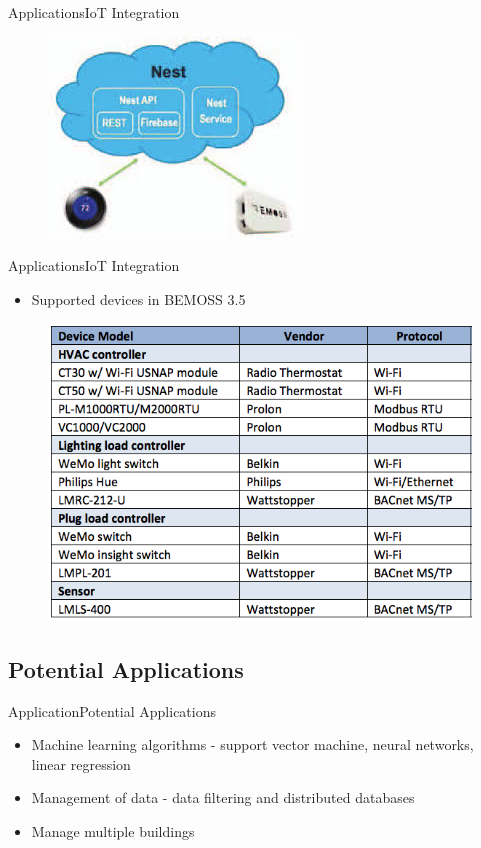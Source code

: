 \documentclass{beamer}
\begin{document}
\begin{frame}{Applications}{IoT Integration}
	\begin{figure}
		\includegraphics[scale=0.7]{figs/nestAndBEMOSS.jpg}
	\end{figure}

\end{frame}

\begin{frame}{Applications}{IoT Integration}
	\begin{itemize}
		\item Supported devices in BEMOSS 3.5
	\end{itemize}
	\begin{figure}
		\includegraphics[scale=0.4]{figs/bemoss35SupportedHardware.png}
	\end{figure}
\end{frame}

\subsection{Potential Applications}
\begin{frame}{Application}{Potential Applications}
	\begin{itemize}
		\item Machine learning algorithms - support vector machine, neural networks, linear regression
		\item Management of data - data filtering and distributed databases
		\item Manage multiple buildings
	\end{itemize}
\end{frame}
\end{document}
